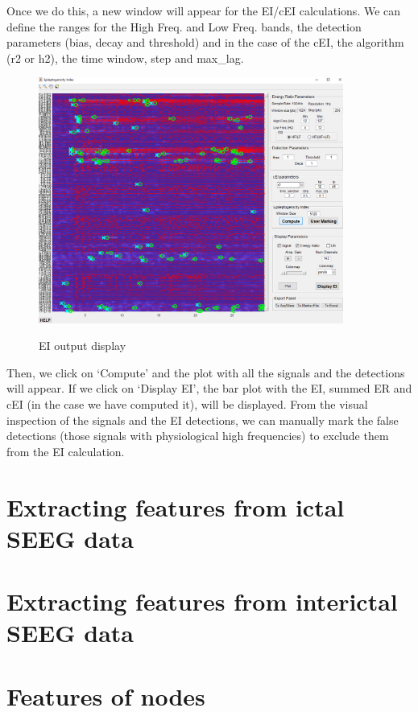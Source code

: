 \documentclass[11pt,oneside]{amsart}
\begin{document}
Once we do this, a new window will appear for the EI/cEI calculations. We can define the ranges for the High Freq. and Low Freq. bands, the detection parameters (bias, decay and threshold) and in the case of the cEI, the algorithm (r2 or h2), the time window, step and max\_lag.

\begin{figure}[H] \hspace{-0cm} \centering \hspace{0cm} \includegraphics[width=10cm,angle=0]{figures/EI.png} \label{fig:6}
    \caption{EI output display} 
\end{figure}

Then, we click on ‘Compute’ and the plot with all the signals and the detections will appear. If we click on ‘Display EI’, the bar plot with the EI, summed ER and cEI (in the case we have computed it), will be displayed.
From the visual inspection of the signals and the EI detections, we can manually mark the false detections (those signals with physiological high frequencies) to exclude them from the EI calculation.


 \section{Extracting features from ictal SEEG data}
 
 
 \section{Extracting features from interictal SEEG data}

 
 \section{Features of nodes}
 
\end{document}
